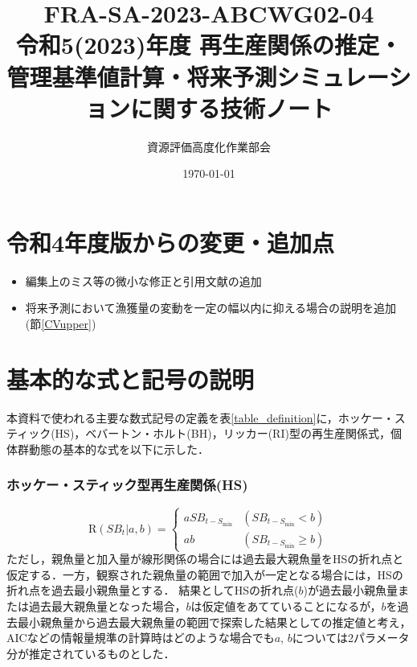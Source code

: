 \documentclass[11pt]{jsarticle}
\begin{document}
\title{{\large FRA-SA-2023-ABCWG02-04} \\
  令和5(2023)年度 再生産関係の推定・管理基準値計算・将来予測シミュレーションに関する技術ノート 
}
\author{資源評価高度化作業部会}
\date{\today}
\maketitle

\section{令和4年度版からの変更・追加点}
\begin{itemize}
\item 編集上のミス等の微小な修正と引用文献の追加
\item 将来予測において漁獲量の変動を一定の幅以内に抑える場合の説明を追加(節\ref{CVupper})
\end{itemize}

\section{基本的な式と記号の説明}
本資料で使われる主要な数式記号の定義を表\ref{table_definition}に，ホッケー・スティック(HS)\cite{hockey}，ベバートン・ホルト(BH)\cite{beverton}，リッカー(RI)\cite{ricker}型の再生産関係式，個体群動態の基本的な式を以下に示した． 

\subsubsection*{ホッケー・スティック型再生産関係(HS)}
\begin{equation}
  \mathrm{R}(S\!B_{t}|a,b)=\begin{cases}
    a  S\!B_{t-S_{\mathrm{min}}} & (S\!B_{t-S_{\mathrm{min}}} < b) \\
    a  b                 & (S\!B_{t-S_{\mathrm{min}}} \geq b)
  \end{cases}
  \label{HS}
\end{equation}
ただし，親魚量と加入量が線形関係の場合には過去最大親魚量をHSの折れ点と仮定する．一方，観察された親魚量の範囲で加入が一定となる場合には，HSの折れ点を過去最小親魚量とする．
結果としてHSの折れ点($b$)が過去最小親魚量または過去最大親魚量となった場合，$b$は仮定値をあてていることになるが，$b$を過去最小親魚量から過去最大親魚量の範囲で探索した結果としての推定値と考え，AICなどの情報量規準の計算時はどのような場合でも$a$, $b$については2パラメータ分が推定されているものとした．
\end{document}
